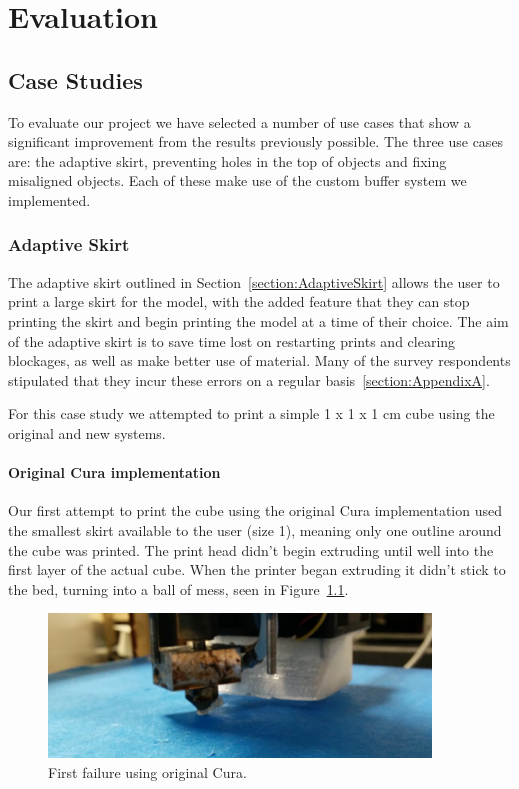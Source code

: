 \documentclass[11pt]{report} %
\begin{document}
\chapter{Evaluation}
\section{Case Studies}
To evaluate our project we have selected a number of use cases that show a significant improvement from the results previously possible. The three use cases are: the adaptive skirt, preventing holes in the top of objects and fixing misaligned objects. Each of these make use of the custom buffer system we implemented.

\subsection{Adaptive Skirt}
The adaptive skirt outlined in Section~\ref{section:AdaptiveSkirt} allows the user to print a large skirt for the model, with the added feature that they can stop printing the skirt and begin printing the model at a time of their choice. The aim of the adaptive skirt is to save time lost on restarting prints and clearing blockages, as well as make better use of material. Many of the survey respondents stipulated that they incur these errors on a regular basis~\ref{section:AppendixA}.

For this case study we attempted to print a simple 1 x 1 x 1 cm cube using the original and new systems.  

\subsubsection{Original Cura implementation}
Our first attempt to print the cube using the original Cura implementation used the smallest skirt available to the user (size 1), meaning only one outline around the cube was printed. The print head didn't begin extruding until well into the first layer of the actual cube. When the printer began extruding it didn't stick to the bed, turning into a ball of mess, seen in Figure~\ref{figure:SkirtOld1}.

\begin{figure}[H]
  \centering
  \includegraphics[width=4in]{SkirtOld1.png}
  \caption{First failure using original Cura.}
  \label{figure:SkirtOld1}
\end{figure}
\end{document}
